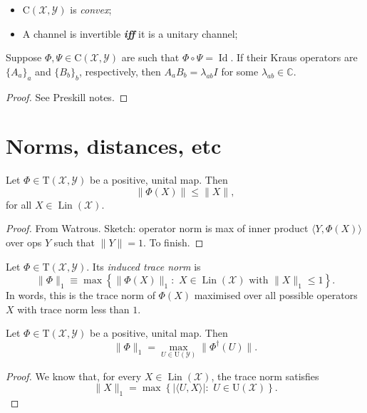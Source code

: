 \documentclass[12pt]{report}
\newcommand{\CC}{\mathbb{C}}
\newcommand{\calY}{{\mathcal{Y}}}
\newcommand{\calX}{{\mathcal{X}}}
\newcommand{\rmC}{{\mathrm{C}}}
\newcommand{\rmT}{{\mathrm{T}}}
\newcommand{\rmU}{{\mathrm{U}}}
\DeclareMathOperator{\Id}{Id}
\DeclareMathOperator{\Lin}{Lin}
\begin{document}
\begin{itemize}
	\item $\rmC(\calX,\calY)$ is \emph{convex};
	\item A channel is invertible \emph{\textbf{iff}} it is a unitary channel;
\end{itemize}

\begin{thm}
	Suppose $\Phi,\Psi\in\rmC(\calX,\calY)$ are such that $\Phi\circ\Psi=\Id$. If their Kraus operators are $\{A_a\}_a$ and $\{B_b\}_b$, respectively, then $A_a B_b=\lambda_{ab} I$ for some $\lambda_{ab}\in\CC$.
\end{thm}
\begin{proof}
	See Preskill notes.
\end{proof}

\section{Norms, distances, etc}

\begin{prop}
	Let $\Phi\in\rmT(\calX,\calY)$ be a positive, unital map. Then
	\begin{equation}
		\|\Phi(X)\| \le \|X\|,
	\end{equation}
	for all $X\in\Lin(\calX)$.
\end{prop}
\begin{proof}
	From Watrous.
	Sketch: operator norm is max of inner product $\langle Y,\Phi(X)\rangle$ over ops $Y$ such that $\|Y\|=1$. To finish.
\end{proof}

\begin{defn}
	Let $\Phi\in\rmT(\calX,\calY)$. Its \emph{induced trace norm} is
	\begin{equation}
		\|\Phi\|_1 \equiv \max\left\{\|\Phi(X)\|_1 :
		\,\, X\in\Lin(\calX) \text{ with } \|X\|_1\le 1
		\right\}.
	\end{equation}
	In words, this is the trace norm of $\Phi(X)$ maximised over all possible operators $X$ with trace norm less than $1$.
\end{defn}

\begin{prop}
	Let $\Phi\in\rmT(\calX,\calY)$ be a positive, unital map. Then
	\begin{equation}
		\|\Phi\|_1 = \max_{U\in\rmU(\calY)}\|\Phi^\dagger(U)\|.
	\end{equation}
\end{prop}
\begin{proof}
	We know that, for every $X\in\Lin(\calX)$, the trace norm satisfies
	\begin{equation}
		\|X\|_1 = \max\left\{
		\lvert\langle U,X\rangle\rvert : \,\, U\in\rmU(\calX)
		\right\}.
	\end{equation}

\end{proof}
\end{document}
